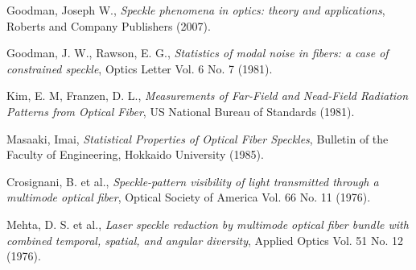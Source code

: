 \documentclass{article}       %
\begin{document}
\begin{thebibliography}{9}

 Goodman, Joseph W., \emph{Speckle phenomena in optics: theory and applications}, Roberts and Company Publishers (2007).

 Goodman, J. W., Rawson, E. G., \emph{Statistics of modal noise in fibers: a case of constrained speckle}, Optics Letter Vol. 6 No. 7 (1981).

 Kim, E. M, Franzen, D. L., \emph{Measurements of Far-Field and Nead-Field Radiation Patterns from Optical Fiber}, US National Bureau of Standards (1981).

 Masaaki, Imai, \emph{Statistical Properties of Optical Fiber Speckles}, Bulletin of the Faculty of Engineering, Hokkaido University (1985).

 Crosignani, B. et al., \emph{Speckle-pattern visibility of light transmitted through a multimode optical fiber}, Optical Society of America Vol. 66 No. 11 (1976).

 Mehta, D. S. et al., \emph{Laser speckle reduction by multimode optical
fiber bundle with combined temporal,
spatial, and angular diversity},  Applied Optics Vol. 51 No. 12 (1976).

\end{thebibliography}
\end{document}
